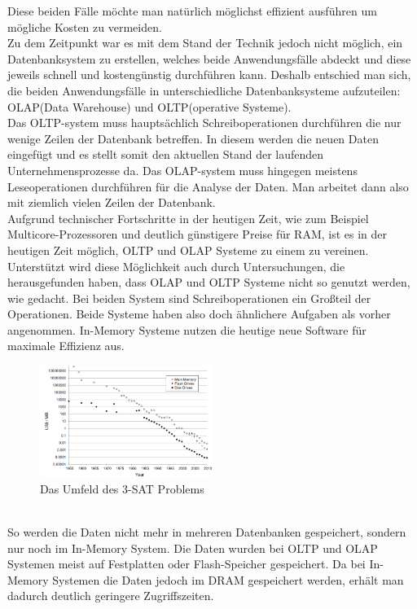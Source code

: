 Diese beiden Fälle möchte man natürlich möglichst effizient ausführen um mögliche Kosten zu vermeiden.
\\
Zu dem Zeitpunkt war es mit dem Stand der Technik jedoch nicht möglich, ein Datenbanksystem zu erstellen, welches beide Anwendungsfälle abdeckt und diese jeweils schnell und kostengünstig durchführen kann. Deshalb entschied man sich,
die beiden Anwendungsfälle in unterschiedliche Datenbanksysteme aufzuteilen: OLAP(Data Warehouse) und OLTP(operative Systeme).
\\
Das OLTP-system muss hauptsächlich Schreiboperationen durchführen die nur wenige Zeilen der Datenbank betreffen. In diesem werden die neuen Daten eingefügt und es stellt somit den aktuellen Stand der laufenden Unternehmensprozesse da. Das OLAP-system muss hingegen meistens Leseoperationen durchführen für die Analyse der Daten. Man arbeitet dann also mit ziemlich vielen Zeilen der Datenbank.
\\
Aufgrund technischer Fortschritte in der heutigen Zeit, wie zum Beispiel Multicore-Prozessoren und deutlich günstigere Preise für RAM,
ist es in der heutigen Zeit möglich, OLTP und OLAP Systeme zu einem zu vereinen.
Unterstützt wird diese Möglichkeit auch durch Untersuchungen, die herausgefunden haben, dass OLAP und OLTP Systeme nicht so genutzt werden, wie gedacht. Bei beiden System sind Schreiboperationen ein Großteil der Operationen. Beide Systeme haben also doch ähnlichere Aufgaben als vorher angenommen. In-Memory Systeme nutzen die heutige neue Software für maximale Effizienz aus.
\begin{figure}[ht]
  \begin{center}
  \includegraphics[width=0.5\textwidth]{images/mainflashdisk.png}
  \end{center}
  \caption{Das Umfeld des 3-SAT Problems}
  \label{fig_1}
\end{figure} 
\\
So werden die Daten nicht mehr in mehreren Datenbanken gespeichert, sondern nur noch im In-Memory System. Die Daten wurden bei OLTP und OLAP Systemen meist auf Festplatten oder Flash-Speicher gespeichert. Da bei In-Memory Systemen die Daten jedoch im DRAM gespeichert werden, erhält man dadurch deutlich geringere Zugriffszeiten.

